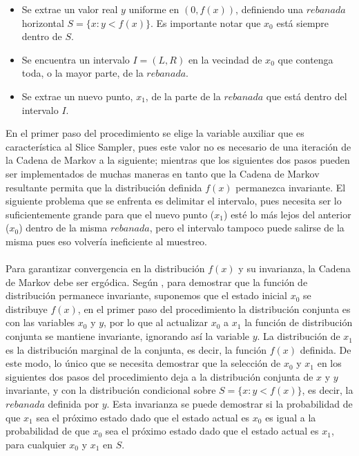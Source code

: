 \begin{itemize}
\item Se extrae un valor real $y$ uniforme en $(0,f(x))$, definiendo una $rebanada$ horizontal $S=\{x:y<f(x)\}$. Es importante notar que $x_0$ est\'a siempre dentro de $S$.
\item Se encuentra un intervalo $I=(L,R)$ en la vecindad de $x_0$ que contenga toda, o la mayor parte, de la $rebanada$.
\item Se extrae un nuevo punto, $x_1$, de la parte de la $rebanada$ que est\'a dentro del intervalo $I$.
\end{itemize}
En el primer paso del procedimiento se elige la variable auxiliar que es caracter\'istica al Slice Sampler, pues este valor no es necesario de una iteraci\'on de la Cadena de Markov a la siguiente; mientras que los siguientes dos pasos pueden ser implementados de muchas maneras en tanto que la Cadena de Markov resultante permita que la distribuci\'on definida $f(x)$ permanezca invariante. El siguiente problema que se enfrenta es delimitar el intervalo, pues necesita ser lo suficientemente grande para que el nuevo punto ($x_1$) est\'e lo m\'as lejos del anterior ($x_0$) dentro de la misma $rebanada$, pero el intervalo tampoco puede salirse de la misma pues eso volver\'ia ineficiente al muestreo.\\
\\
Para garantizar convergencia en la distribuci\'on $f(x)$ y su invarianza, la Cadena de Markov debe ser erg\'odica. Seg\'un \cite{neal2003slice}, para demostrar que la funci\'on de distribuci\'on permanece invariante, suponemos que el estado inicial $x_0$ se distribuye $f(x)$, en el primer paso del procedimiento la distribuci\'on conjunta es con las variables $x_0$ y $y$, por lo que al actualizar $x_0$ a $x_1$ la funci\'on de distribuci\'on conjunta se mantiene invariante, ignorando as\'i la variable $y$. La distribuci\'on de $x_1$ es la distribuci\'on marginal de la conjunta, es decir, la funci\'on $f(x)$ definida. De este modo, lo \'unico que se necesita demostrar que la selecci\'on de $x_0$ y $x_1$ en los siguientes dos pasos del procedimiento deja a la distribuci\'on conjunta de $x$ y $y$ invariante, y con la distribuci\'on condicional sobre $S=\{x:y<f(x)\}$, es decir, la $rebanada$ definida por $y$. Esta invarianza se puede demostrar si la probabilidad de que $x_1$ sea el pr\'oximo estado dado que el estado actual es $x_0$ es igual a la probabilidad de que $x_0$ sea el pr\'oximo estado dado que el estado actual es $x_1$, para cualquier $x_0$ y $x_1$ en $S$.\\
